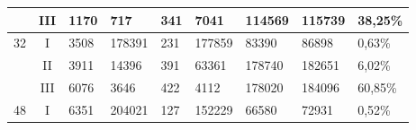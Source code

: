 \begin{tabular}{cclllllll}
                                                                                           & III                                & 1170                        & 717                         & 341                         & 7041                         & 114569     & 115739                                                                                                          & 38,25\%                                                                                                           \\ 
    \midrule
    \multirow{3}{*}{32}                                                                    & I                                  & 3508                        & 178391                      & 231                         & 177859                       & 83390      & 86898                                                                                                           & 0,63\%                                                                                                            \\
                                                                                           & II                                 & 3911                        & 14396                       & 391                         & 63361                        & 178740     & 182651                                                                                                          & 6,02\%                                                                                                            \\
                                                                                           & III                                & 6076                        & 3646                        & 422                         & 4112                         & 178020     & 184096                                                                                                          & 60,85\%                                                                                                           \\ 
    \midrule
    \multirow{3}{*}{48}                                                                    & I                                  & 6351                        & 204021                      & 127                         & 152229                       & 66580      & 72931                                                                                                           & 0,52\%                                                                                                            \\

\end{tabular}
